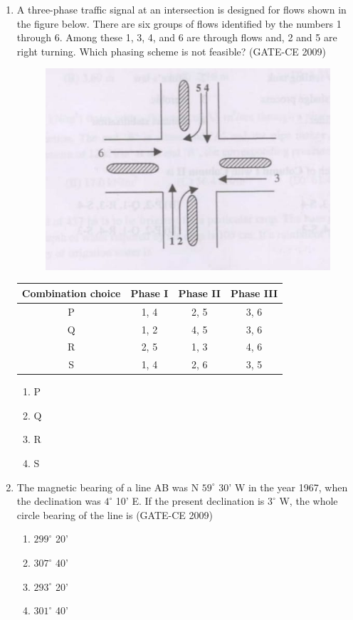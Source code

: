 \documentclass[journal,12pt,onecolumn]{article}
\theoremstyle{remark}
\begin{document}
\begin{enumerate}
    \item A three-phase traffic signal at an intersection is designed for flows shown in the figure below. There are six groups of flows identified by the numbers 1 through 6. Among these 1, 3, 4, and 6 are through flows and, 2 and 5 are right turning. Which phasing scheme is not feasible? (GATE-CE 2009)
    \begin{figure}[H]
    \centering
    \includegraphics[width=0.7\columnwidth]{figs/image4.jpg}
    \caption{}
    \label{fig:placeholder}
    \end{figure}
    \begin{tabular}{|c|c|c|c|}
    \hline
    Combination choice & Phase I & Phase II & Phase III \\
    \hline
    P & 1, 4 & 2, 5 & 3, 6 \\
    Q & 1, 2 & 4, 5 & 3, 6 \\
    R & 2, 5 & 1, 3 & 4, 6 \\
    S & 1, 4 & 2, 6 & 3, 5 \\
    \hline
    \end{tabular}
    \begin{enumerate}
        \item P 
        \item Q 
        \item R 
        \item S
    \end{enumerate}
    
    \item The magnetic bearing of a line AB was N $59^\circ$ 30' W in the year 1967, when the declination was $4^\circ$ 10' E. If the present declination is $3^\circ$ W, the whole circle bearing of the line is (GATE-CE 2009)
    \begin{enumerate}
        \item $299^\circ$ 20' 
        \item $307^\circ$ 40' 
        \item $293^\circ$ 20' 
        \item $301^\circ$ 40'
    \end{enumerate}
    

\end{enumerate}
\end{document}
